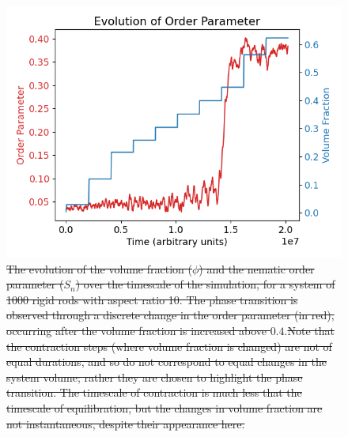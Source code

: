 \documentclass[11pt, a4paper]{article} %
\providecommand{\DIFadd}[1]{{\protect\color{blue}\uwave{#1}}} %
\providecommand{\DIFdel}[1]{{\protect\color{red}\sout{#1}}}                      %
\providecommand{\DIFaddFL}[1]{\DIFadd{#1}} %
\providecommand{\DIFdelFL}[1]{\DIFdel{#1}} %
\providecommand{\DIFaddbeginFL}{} %
\providecommand{\DIFaddendFL}{} %
\providecommand{\DIFdelbeginFL}{} %
\providecommand{\DIFdelendFL}{} %
\begin{document}
\begin{figure} [h!]
	\centering
	\includegraphics[width=0.7\linewidth]{Figures/rigidrod_nemorderparam}
	\caption{\DIFdelbeginFL \DIFdelFL{The evolution of the volume fraction ($\phi$) and the nematic order parameter ($S_{n}$) over the timescale of the simulation, for a system of 1000 rigid rods with aspect ratio 10. The phase transition is observed through a discrete change in the order parameter (in red), occurring after the volume fraction is increased above $0.4$}\DIFdelendFL \DIFaddbeginFL \DIFaddFL{\textcolor{forestgreen}{The evolution of the volume fraction and the nematic order parameter over the timescale of the simulation, for a system of 1000 rigid rods with aspect ratio 10. The jump in $S_n$ (red line) occurs at about $\phi \sim 0.4$. Note that the contraction steps, where the volume fraction is increased, are not of equal durations, and so do not correspond to equal changes in the system volume; rather they are chosen to highlight the phase transition. The contraction period is much shorter than the equilibration time, but the changes in volume fraction are not instantaneous, despite their appearance here}}\DIFaddendFL .\DIFdelbeginFL \DIFdelFL{Note that the contraction steps (where volume fraction is changed) are not of equal durations, and so do not correspond to equal changes in the system volume; rather they are chosen to highlight the phase transition. The timescale of contraction is much less that the timescale of equilibration, but the changes in volume fraction are not instantaneous, despite their appearance here.}\DIFdelendFL }
	\label{fig:rr_nemorderparam}
\end{figure}  %
\end{document}
